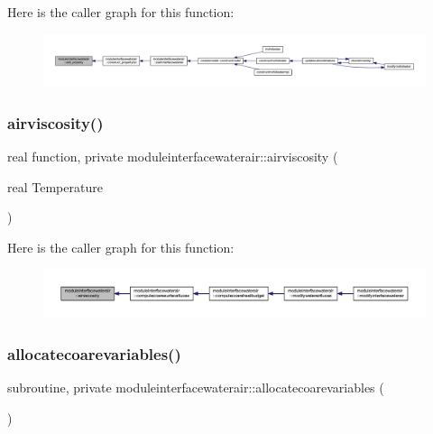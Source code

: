 Here is the caller graph for this function\+:\nopagebreak
\begin{figure}[H]
\begin{center}
\leavevmode
\includegraphics[width=350pt]{namespacemoduleinterfacewaterair_a2a801625d49cd1732858f2dc52a71271_icgraph}
\end{center}
\end{figure}
\mbox{\label{namespacemoduleinterfacewaterair_adc7a37061f983410896c39bb15a20517}} 
\subsubsection{\texorpdfstring{airviscosity()}{airviscosity()}}
{\footnotesize\ttfamily real function, private moduleinterfacewaterair\+::airviscosity (\begin{DoxyParamCaption}\item[{real}]{Temperature }\end{DoxyParamCaption})\hspace{0.3cm}{\ttfamily [private]}}

Here is the caller graph for this function\+:\nopagebreak
\begin{figure}[H]
\begin{center}
\leavevmode
\includegraphics[width=350pt]{namespacemoduleinterfacewaterair_adc7a37061f983410896c39bb15a20517_icgraph}
\end{center}
\end{figure}
\mbox{\label{namespacemoduleinterfacewaterair_ad1e0a14ea6e30cf93be9661a4a71a0f7}} 
\subsubsection{\texorpdfstring{allocatecoarevariables()}{allocatecoarevariables()}}
{\footnotesize\ttfamily subroutine, private moduleinterfacewaterair\+::allocatecoarevariables (\begin{DoxyParamCaption}{ }\end{DoxyParamCaption})\hspace{0.3cm}{\ttfamily [private]}}

